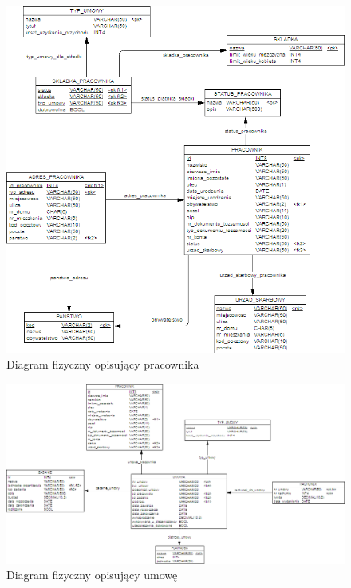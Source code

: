 \begin{figure}[tdh]
    \begin{center}
	\includegraphics[scale=.8]{img/fizyczny2.png}
	\caption{Diagram fizyczny opisujący pracownika}
	\label{fizyczny2}
    \end{center}
\end{figure}
\begin{figure}[tdh]
    \begin{center}
	\includegraphics[scale=.8,angle=-90]{img/fizyczny3.png}
	\caption{Diagram fizyczny opisujący umowę}
	\label{fizyczny3}
    \end{center}
\end{figure}

